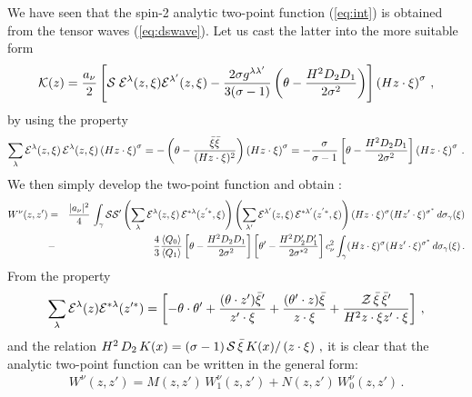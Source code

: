 \documentclass[a4paper,11pt,showpacs,preprintnumbers]{revtex4}
\def\z {{\cal Z}}
\begin{document}
We have seen that the  spin-2 analytic two-point function
(\ref{eq:int}) is obtained from the tensor waves
(\ref{eq:dswave}). Let us cast the latter into the more suitable
form
\begin{equation}
{\cal K}(z)=\frac{a_{\nu}}{2} \left[ {\cal S}\;{\cal
E}^{\lambda}(z,\xi){\cal E}^{\lambda'}(z,\xi)-\frac{2\sigma
g^{\lambda\lambda'}}{3(\sigma-1)}\left(
\theta-\frac{H^{2}D_{2}D_{1}}{2\sigma^{2}}\right) \right]\left(H
z\cdot \xi \right)^{\sigma}\,,
\end{equation}
by using the property
\begin{equation}
\sum_{\lambda}{\cal E }^{\lambda}(z,\xi)\,{\cal E
}^{\lambda}(z,\xi)\left( H z\cdot\xi
\right)^{\sigma}=-\left(\theta-\frac{\bar\xi
\bar\xi}{(Hz\cdot\xi)^{2}}\right)\left( H z\cdot\xi
\right)^{\sigma}=-
\frac{\sigma}{\sigma-1}\left[\theta-\frac{H^{2}D_{2}D_{1}}{2\sigma^{2}}\right]\left(
H z\cdot\xi \right)^{\sigma}\,.
\end{equation}
We then simply develop the two-point function and obtain :
\begin{eqnarray}\label{eqn:tpfunction1}
W^{\nu}(z,z')&=& \frac{\vert a_{\nu}\vert^{2}}{4}\,
\int_\gamma{\cal S }{\cal S' }\left(\sum_{\lambda}{\cal
E}^{\lambda}(z,\xi) \,{\cal
E}^{*\lambda}(z^{'*},\xi)\right)\left(\sum_{\lambda'}{\cal
E}^{\lambda'}(z,\xi) \,{\cal
E}^{*\lambda'}(z^{'*},\xi)\right)(Hz\cdot\xi)^{\sigma} (H z'\cdot \xi)^{\sigma^{*}}\,d\sigma_\gamma(\xi)\nonumber\\
&-&\frac{4}{3}\frac{\langle Q_{0}\rangle }{\langle Q_{1}\rangle
}\left[ \theta-\frac{H^{2}D_{2}D_{1}}{2\sigma^{2}}\right] \left[
\theta'-\frac{H^{2}D'_{2}D'_{1}}{2\sigma^{*2}}\right]c_\nu^{2}\int_\gamma
(Hz\cdot\xi)^{\sigma} (H z'\cdot \xi
)^{\sigma^{*}}\,d\sigma_\gamma(\xi)\,.
\end{eqnarray}
From  the  property
\begin{equation}\label{eq:prop1}
\sum_{\lambda}{\cal E}^{\lambda}(z){\cal
E}^{*\lambda}(z'^{*})=\left[-
\theta\cdot\theta'+\frac{(\theta\cdot
z')\bar\xi'}{z'\cdot\xi}+\frac{(\theta'\cdot
z)\bar\xi}{z\cdot\xi}+\frac{\z\,\bar\xi\,\bar\xi'}{H^{2}z\cdot\xi
z'\cdot\xi}\right]\,,
\end{equation}
and  the relation $H^{2}\,D_{2}\,K(x)=(\sigma-1)\,{\cal S
}\,\bar\xi \,K (x)/ \left(z\cdot\xi\right)\,, $ it is clear that
the analytic two-point function can be written in  the general
form:
\begin{eqnarray}\label{eqn:tpfunction2}
W^{\nu}(z,z')= M(z,z')\,W_{1}^{\nu}(z,z')
+N(z,z')\,W^{\nu}_{0}(z,z')\,.
\end{eqnarray}
\end{document}
